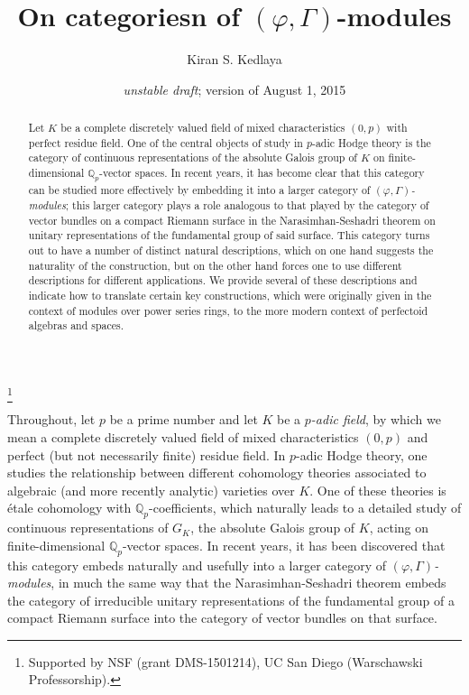\documentclass[12pt]{amsart}
\theoremstyle{definition}
\numberwithin{equation}{theorem}
\newcommand{\QQ}{\mathbb{Q}}
\begin{document}
\title{On categoriesn of $(\varphi, \Gamma)$-modules}
\author{Kiran S. Kedlaya}
\thanks{Supported by NSF (grant DMS-1501214), UC San Diego (Warschawski Professorship).}
\date{\textit{unstable draft}; version of August 1, 2015}

\begin{abstract}
Let $K$ be a complete discretely valued field of mixed characteristics $(0,p)$ with perfect residue field. One of the central objects of study in $p$-adic Hodge theory is the cate\-gory of continuous representations of the absolute Galois group of $K$ on finite-dimensional $\QQ_p$-vector spaces. In recent years, it has become clear that this category can be studied more effectively by embedding it into a larger category of \emph{$(\varphi, \Gamma)$-modules}; this larger category plays a role analogous to that played by the category of vector bundles on a compact Riemann surface in the Narasimhan-Seshadri theorem on unitary representations of the fundamental group of said surface. This category turns out to have a number of distinct natural descriptions, which on one hand suggests the naturality of the construction, but on the other hand forces one to use different descriptions for different applications. We provide several of these descriptions and indicate how to translate certain key constructions, which were originally given in the context of modules over power series rings, to the more modern context of perfectoid algebras and spaces.
\end{abstract}

\maketitle

Throughout, let $p$ be a prime number and let $K$ be a \emph{$p$-adic field}, by which we mean a complete discretely valued field of mixed characteristics $(0,p)$ and perfect (but not necessarily finite) residue field. In $p$-adic Hodge theory, one studies the relationship between different cohomology theories associated to algebraic (and more recently analytic) varieties over $K$. One of these theories is \'etale cohomology with $\QQ_p$-coefficients, which naturally leads to a detailed study of continuous representations of $G_K$, the absolute Galois group of $K$, acting on finite-dimensional $\QQ_p$-vector spaces. In recent years, it has been discovered that this category embeds naturally and usefully into a larger category of \emph{$(\varphi, \Gamma)$-modules}, in much the same way that the Narasimhan-Seshadri theorem embeds the category of irreducible unitary representations of the fundamental group of a compact Riemann surface into the category of vector bundles on that surface.
\end{document}
